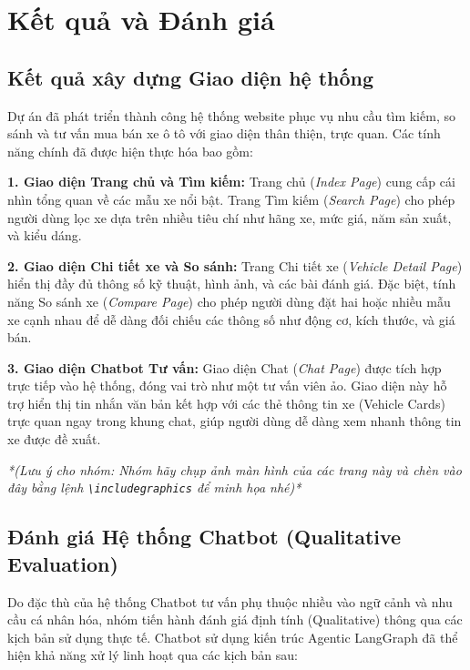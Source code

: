 \section{Kết quả và Đánh giá}

\subsection{Kết quả xây dựng Giao diện hệ thống}
Dự án đã phát triển thành công hệ thống website phục vụ nhu cầu tìm kiếm, so sánh và tư vấn mua bán xe ô tô với giao diện thân thiện, trực quan. Các tính năng chính đã được hiện thực hóa bao gồm:

\textbf{1. Giao diện Trang chủ và Tìm kiếm:}
Trang chủ (\textit{Index Page}) cung cấp cái nhìn tổng quan về các mẫu xe nổi bật. Trang Tìm kiếm (\textit{Search Page}) cho phép người dùng lọc xe dựa trên nhiều tiêu chí như hãng xe, mức giá, năm sản xuất, và kiểu dáng.

\textbf{2. Giao diện Chi tiết xe và So sánh:}
Trang Chi tiết xe (\textit{Vehicle Detail Page}) hiển thị đầy đủ thông số kỹ thuật, hình ảnh, và các bài đánh giá. Đặc biệt, tính năng So sánh xe (\textit{Compare Page}) cho phép người dùng đặt hai hoặc nhiều mẫu xe cạnh nhau để dễ dàng đối chiếu các thông số như động cơ, kích thước, và giá bán.

\textbf{3. Giao diện Chatbot Tư vấn:}
Giao diện Chat (\textit{Chat Page}) được tích hợp trực tiếp vào hệ thống, đóng vai trò như một tư vấn viên ảo. Giao diện này hỗ trợ hiển thị tin nhắn văn bản kết hợp với các thẻ thông tin xe (Vehicle Cards) trực quan ngay trong khung chat, giúp người dùng dễ dàng xem nhanh thông tin xe được đề xuất.

\textit{*(Lưu ý cho nhóm: Nhóm hãy chụp ảnh màn hình của các trang này và chèn vào đây bằng lệnh \texttt{\textbackslash includegraphics} để minh họa nhé)*}

\subsection{Đánh giá Hệ thống Chatbot (Qualitative Evaluation)}
Do đặc thù của hệ thống Chatbot tư vấn phụ thuộc nhiều vào ngữ cảnh và nhu cầu cá nhân hóa, nhóm tiến hành đánh giá định tính (Qualitative) thông qua các kịch bản sử dụng thực tế. Chatbot sử dụng kiến trúc Agentic LangGraph đã thể hiện khả năng xử lý linh hoạt qua các kịch bản sau:

